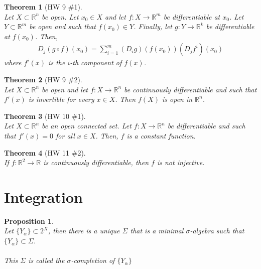 \documentclass[10pt,a4paper]{article}
\newtheorem{theorem}{Theorem}
\newtheorem{proposition}{Proposition}
\theoremstyle{definition}
\theoremstyle{definition}
\numberwithin{equation}{section}
\numberwithin{theorem}{section}
\numberwithin{proposition}{section}
\numberwithin{lemma}{section}
\numberwithin{corollary}{section}
\begin{document}
\begin{theorem}[HW 9 $\#$1]$ $
\\Let $X \subset \mathbb{R}^n$ be open. Let $x_0 \in X$ and let $f: X \to \mathbb{R}^m$ be differentiable at $x_0$. Let $Y \subset \mathbb{R}^m$ be open and such that $f(x_0) \in Y$. Finally, let $g: Y \to \mathbb{R}^k$ be differentiable at $f(x_0)$. Then,
\begin{align*}
D_j(g \circ f)(x_0) = \sum_{i = 1}^m (D_i g)(f(x_0))(D_jf^i)(x_0)
\end{align*}
where $f^i(x)$ is the $i$-th component of $f(x)$. 
\end{theorem}

\begin{theorem}[HW 9 $\#$2]$ $
\\Let $X \subset \mathbb{R}^n$ be open and let $f: X \to \mathbb{R}^n$ be continuously differentiable and such that $f'(x)$ is invertible for every $x \in X$. Then $f(X)$ is open in $\mathbb{R}^n$. 
\end{theorem}

\begin{theorem}[HW 10 $\#$1]$ $
\\Let $X \subset \mathbb{R}^n$ be an open connected set. Let $f: X \to \mathbb{R}^n$ be differentiable and such that $f'(x) = 0$ for all $x \in X$. Then, $f$ is a constant function. 
\end{theorem}

\begin{theorem}[HW 11 $\#$2]$ $
\\If $f: \mathbb{R}^2 \to \mathbb{R}$ is continuously differentiable, then $f$ is not injective. 
\end{theorem}

\newpage

\section{Integration}

\begin{proposition}$ $
\\Let $\{Y_{\alpha}\} \subset 2^X$, then there is a unique $\Sigma$ that is a minimal $\sigma$-algebra such that $\{Y_{\alpha}\} \subset \Sigma$. 
\\
\\This $\Sigma$ is called the $\sigma$-completion of $\{Y_{\alpha}\}$
\end{proposition}
\end{document}

